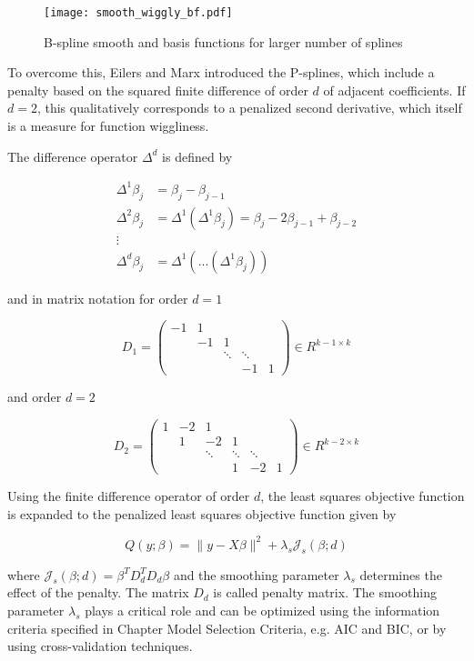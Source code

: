 \begin{figure}[H]
\centering
\texttt{[image: smooth\_wiggly\_bf.pdf]}
\caption{B-spline smooth and basis functions for larger number of splines}
\label{fig:smooth_bf_large}
\end{figure}

To overcome this, Eilers and Marx introduced the P-splines, which include a penalty based on the squared finite difference of order $d$ of adjacent coefficients. If $d=2$, this qualitatively  corresponds to a penalized second derivative, which itself is a measure for function wiggliness. \cite{eilers1996flexible}

The difference operator $\Delta^d$ is defined by
	

\begin{align*}
	\Delta^1 \beta_j &= \beta_j - \beta_{j-1} \\
	\Delta^2 \beta_j &= \Delta^1(\Delta^1 \beta_j) = \beta_j - 2\beta_{j-1} + \beta_{j-2} \\ 
  	\vdots \\ 
  	\Delta^d \beta_j &= \Delta^1(...(\Delta^1 \beta_j))
\end{align*}

and in matrix notation for order $d=1$

$$D_1 = \begin{pmatrix} 
				-1& 1&       &        &   \\  
		  &-1& 1     &        &   \\  
		  &  &\ddots & \ddots &   \\ 
		  &  &       & -1     & 1 
		\end{pmatrix} \in R^{k-1\times k}$$

and order $d=2$

$$D_2 = \begin{pmatrix} 
			1& -2& 1& &    \\  
		 	 & 1 & -2 & 1& \\ 	
			 &  & \ddots & \ddots  & \ddots \\ 
			 & & & 1 & -2 & 1 
		\end{pmatrix} \in R^{k-2\times k}$$

Using the finite difference operator of order $d$, the least squares objective function is expanded to the penalized least squares objective function given by

$$Q(y; \beta) = \lVert y - X\beta \rVert^2 + \lambda_s \mathcal J_s(\beta; d)$$

where $\mathcal J_s(\beta; d) = \beta^T D_d^T D_d \beta$ and the smoothing parameter $\lambda_s$ determines the effect of the penalty. The matrix $D_d$ is called penalty matrix. The smoothing parameter $\lambda_s$ plays a critical role and can be optimized using the information criteria specified in Chapter Model Selection Criteria, e.g. AIC and BIC, or by using cross-validation techniques. \cite{fahrmeir2013regression}

